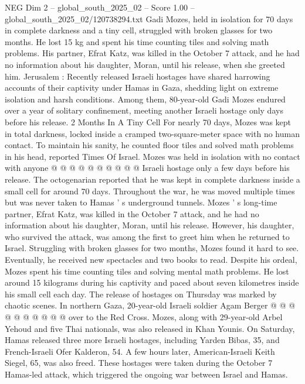 \begin{textsample}{NEG Dim 2 – global\_south\_2025\_02 – Score 1.00 – global\_south\_2025\_02/120738294.txt}  \label{ex:f2_neg_019}
Gadi Mozes, held in isolation for 70 days in complete darkness and a tiny cell, struggled with broken glasses for two months.
He lost 15 kg and spent his time counting tiles and solving math problems.
His partner, Efrat Katz, was killed in the October 7 attack, and he had no information about his daughter, Moran, until his release, when she greeted him.
Jerusalem : Recently released Israeli hostages have shared harrowing accounts of their captivity under Hamas in Gaza, shedding light on extreme isolation and harsh conditions.
Among them, 80-year-old Gadi Mozes endured over a year of solitary confinement, meeting another Israeli hostage only days before his release. 2 Months In A Tiny Cell For nearly 70 days, Mozes was kept in total darkness, locked inside a cramped two-square-meter space with no human contact.
To maintain his sanity, he counted floor tiles and solved math problems in his head, reported Times Of Israel.
Mozes was held in isolation with no contact with anyone @ @ @ @ @ @ @ @ @ @ Israeli hostage only a few days before his release.
The octogenarian reported that he was kept in complete darkness inside a small cell for around 70 days.
Throughout the war, he was moved multiple times but was never taken to Hamas ' s underground tunnels.
Mozes ' s long-time partner, Efrat Katz, was killed in the October 7 attack, and he had no information about his daughter, Moran, until his release.
However, his daughter, who survived the attack, was among the first to greet him when he returned to Israel.
Struggling with broken glasses for two months, Mozes found it hard to see.
Eventually, he received new spectacles and two books to read.
Despite his ordeal, Mozes spent his time counting tiles and solving mental math problems.
He lost around 15 kilograms during his captivity and paced about seven kilometres inside his small cell each day.
The release of hostages on Thursday was marked by chaotic scenes.
In northern Gaza, 20-year-old Israeli soldier Agam Berger @ @ @ @ @ @ @ @ @ @ over to the Red Cross.
Mozes, along with 29-year-old Arbel Yehoud and five Thai nationals, was also released in Khan Younis.
On Saturday, Hamas released three more Israeli hostages, including Yarden Bibas, 35, and French-Israeli Ofer Kalderon, 54.
A few hours later, American-Israeli Keith Siegel, 65, was also freed.
These hostages were taken during the October 7 Hamas-led attack, which triggered the ongoing war between Israel and Hamas.

\end{textsample}
